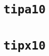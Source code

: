 \section{{\tt tipa10}}\vspace{\chartsep}
{}

\newpage
\section{{\tt tipx10}}\vspace{\chartsep}
{}

\endgroup


